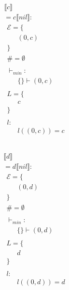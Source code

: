 
\begin{align*} 
	 &  & \\ 
	 & \llbracket c \rrbracket & \\ 
	 & = c\llbracket nil \rrbracket:  & \\ 
	 & \ \ \mathcal{{E}}= \{  & \\ 
	 & \qquad (0, c) \\ 
	 & \ \ \} & \\ 
	 & \ \ \# = \emptyset & \\ 
	 & \ \  & \\ 
	 & \ \ \vdash_{{min}}: & \\ 
	 & \qquad \{  \} \vdash (0, c) \\ 
	 & \ \  & \\ 
	 & \ \ L=\{ & \\ 
	 & \qquad c \\ 
	 & \ \ \} & \\ 
	 & \ \  & \\ 
	 & \ \ l: & \\ 
	 & \qquad l((0, c)) = c \\ 
	 & \ \  & \\ 
\end{align*} 

\begin{align*} 
	 &  & \\ 
	 & \llbracket d \rrbracket & \\ 
	 & = d\llbracket nil \rrbracket:  & \\ 
	 & \ \ \mathcal{{E}}= \{  & \\ 
	 & \qquad (0, d) \\ 
	 & \ \ \} & \\ 
	 & \ \ \# = \emptyset & \\ 
	 & \ \  & \\ 
	 & \ \ \vdash_{{min}}: & \\ 
	 & \qquad \{  \} \vdash (0, d) \\ 
	 & \ \  & \\ 
	 & \ \ L=\{ & \\ 
	 & \qquad d \\ 
	 & \ \ \} & \\ 
	 & \ \  & \\ 
	 & \ \ l: & \\ 
	 & \qquad l((0, d)) = d \\ 
	 & \ \  & \\ 
\end{align*} 

